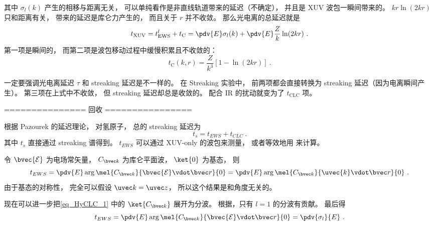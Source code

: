 其中 $\sigma_l(k)$ 产生的相移与距离无关， 可以单纯看作是非直线轨道带来的延迟（不确定）， 并且是 XUV 波包一瞬间带来的。 $kr\ln(2kr)$ 只和距离有关， 带来的延迟是库仑力产生的， 而且关于 $r$ 并不收敛。 那么光电离的总延迟就是
\begin{equation}\label{eq_HeAna2_5}
t_\text{XUV} = t_\text{EWS}^l + t_\text{C} = \pdv{E}\sigma_l(k) + \pdv{E}\frac{Z}{k}\ln(2kr)~. %
\end{equation}
第一项是瞬间的， 而第二项是波包移动过程中缓慢积累且不收敛的：
\begin{equation}\label{eq_t_C_def}
t_\text{C}(k, r) = \frac{Z}{k^3}[1-\ln(2kr)]~.
\end{equation}

一定要强调光电离延迟 $\tau$ 和 streaking 延迟是不一样的。 在 Streaking 实验中， 前两项都会直接转换为 streaking 延迟（因为电离瞬间产生）。 第三项在上式中不收敛， 但 streaking 延迟却总是收敛的。 配合 IR 的扰动就变为了 $t_\text{CLC}$ 项。

=============== 回收 ================

根据 Pazourek 的延迟理论， 对氢原子， 总的 streaking 延迟为
\begin{equation}
t_s = t_{EWS} + t_{CLC}~.
\end{equation}
其中 $t_s$ 直接通过 streaking 谱得到。 $t_{EWS}$ 可以通过 XUV-only 的波包来测量， 或者等效地用 来计算。

令 $\bvec{\mathcal E}$ 为电场常矢量， $C_{\bvec k}$ 为库仑平面波， $\ket{0}$ 为基态， 则
\begin{equation}\label{eq_HyCLC_1}
t_{EWS} = \pdv{E} \arg \mel{C_{\bvec k}}{\bvec{\mathcal E}\vdot \bvec r}{0} = \pdv{E} \arg \mel{C_{\bvec k}}{\uvec{k}\vdot \bvec r}{0}~.
\end{equation}
由于基态的对称性， 完全可以假设 $\uvec k = \uvec z$， 所以这个结果是和角度无关的。

现在可以进一步把\autoref{eq_HyCLC_1} 中的 $\ket{C_{\bvec k}}$ 展开为分波。 根据，只有 $l = 1$ 的分波有贡献。 最后得
\begin{equation}\label{eq_HyCLC_2}
t_{EWS} = \pdv{E} \arg \mel{C_{\bvec k}}{\bvec{\mathcal E}\vdot \bvec r}{0} = \pdv{\sigma_l}{E}~.
\end{equation}


